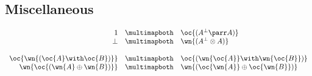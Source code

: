 \subsection{Miscellaneous}\label{miscellaneous}

\(\begin{array}{rcl}
  \one & \linequiv&  \oc{(A\orth\parr A)} \\
  \bot & \linequiv&  \wn{(A\orth\tens A)} \\
\\
  \oc{\wn{(\oc{A}\with\oc{B})}} & \linequiv&  \oc{(\wn{\oc{A}}\with\wn{\oc{B}})} \\
  \wn{\oc{(\wn{A}\plus\wn{B})}} & \linequiv&  \wn{(\oc{\wn{A}}\plus\oc{\wn{B}})}
\end{array}\)


